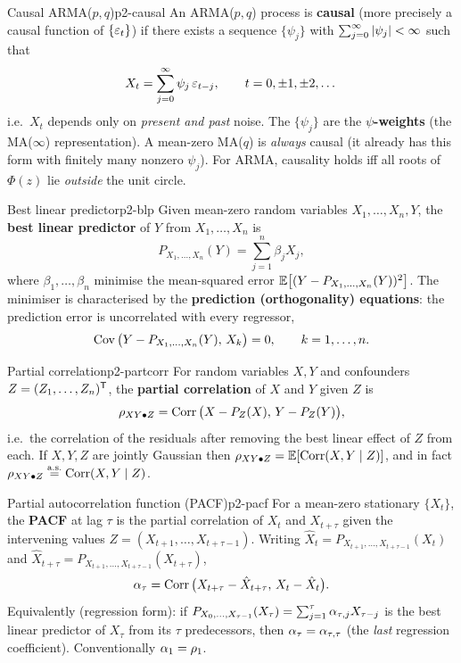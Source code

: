 \begin{definition}{Causal ARMA($p,q$)}{p2-causal}
An ARMA($p,q$) process is \textbf{causal} (more precisely a causal function of
$\{\varepsilon_t\}$) if there exists a sequence $\{\psi_j\}$ with
$\sum_{j=0}^{\infty}\left\lvert \psi_j \right\rvert<\infty$ such that
\[
X_t=\sum_{j=0}^{\infty}\psi_j\,\varepsilon_{t-j},
\qquad t=0,\pm1,\pm2,\dots
\]
i.e.\ $X_t$ depends only on \emph{present and past} noise. The $\{\psi_j\}$ are
the \textbf{$\psi$-weights} (the MA($\infty$) representation). A mean-zero
MA($q$) is \emph{always} causal (it already has this form with finitely many
nonzero $\psi_j$). For ARMA, causality holds iff all roots of $\Phi(z)$ lie
\emph{outside} the unit circle.
\end{definition}

\begin{definition}{Best linear predictor}{p2-blp}
Given mean-zero random variables $X_1,\dots,X_n,Y$, the \textbf{best linear
predictor} of $Y$ from $X_1,\dots,X_n$ is
\[
P_{X_1,\dots,X_n}(Y)=\sum_{j=1}^{n}\beta_j X_j,
\]
where $\beta_1,\dots,\beta_n$ minimise the mean-squared error
$\mathbb{E}\big[(Y-P_{X_1,\dots,X_n}(Y))^2\big]$. The minimiser is characterised by the
\textbf{prediction (orthogonality) equations}: the prediction error is
uncorrelated with every regressor,
\[
\operatorname{Cov}\big(Y-P_{X_1,\dots,X_n}(Y),\,X_k\big)=0,\qquad k=1,\dots,n .
\]
\end{definition}

\begin{definition}{Partial correlation}{p2-partcorr}
For random variables $X,Y$ and confounders $Z=(Z_1,\dots,Z_n)^{\mathsf{T}}$, the
\textbf{partial correlation} of $X$ and $Y$ given $Z$ is
\[
\rho_{XY\bullet Z}=\operatorname{Corr}\big(X-P_Z(X),\,Y-P_Z(Y)\big),
\]
i.e.\ the correlation of the residuals after removing the best linear effect of
$Z$ from each. If $X,Y,Z$ are jointly Gaussian then
$\rho_{XY\bullet Z}=\mathbb{E}[\operatorname{Corr}(X,Y\mid Z)]$, and in fact
$\rho_{XY\bullet Z}\overset{\text{a.s.}}{=}\operatorname{Corr}(X,Y\mid Z)$.
\end{definition}

\begin{definition}{Partial autocorrelation function (PACF)}{p2-pacf}
For a mean-zero stationary $\{X_t\}$, the \textbf{PACF} at lag $\tau$ is the
partial correlation of $X_t$ and $X_{t+\tau}$ given the intervening values
$Z=(X_{t+1},\dots,X_{t+\tau-1})$. Writing
$\hat X_t=P_{X_{t+1},\dots,X_{t+\tau-1}}(X_t)$ and
$\hat X_{t+\tau}=P_{X_{t+1},\dots,X_{t+\tau-1}}(X_{t+\tau})$,
\[
\alpha_\tau=\operatorname{Corr}\big(X_{t+\tau}-\hat X_{t+\tau},\,X_t-\hat X_t\big).
\]
Equivalently (regression form): if
$P_{X_0,\dots,X_{\tau-1}}(X_\tau)=\sum_{j=1}^{\tau}\alpha_{\tau,j}X_{\tau-j}$ is
the best linear predictor of $X_\tau$ from its $\tau$ predecessors, then
$\alpha_\tau=\alpha_{\tau,\tau}$ (the \emph{last} regression coefficient).
Conventionally $\alpha_1=\rho_1$.
\end{definition}

